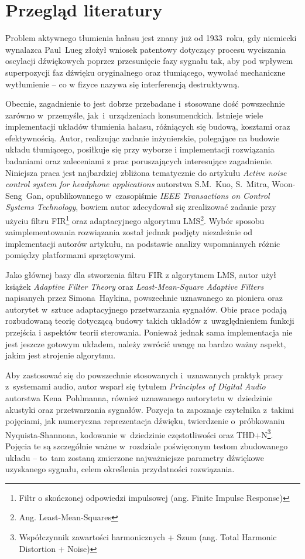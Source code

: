 \section{Przegląd literatury}
Problem aktywnego tłumienia hałasu jest znany już od 1933~roku, gdy niemiecki wynalazca Paul~Lueg złożył wniosek patentowy \cite{LuegPatent} dotyczący procesu wyciszania oscylacji dźwiękowych poprzez przesunięcie fazy sygnału tak, aby pod wpływem superpozycji faz dźwięku oryginalnego oraz tłumiącego, wywołać mechaniczne wytłumienie -- co w fizyce nazywa się interferencją destruktywną.

Obecnie, zagadnienie to jest dobrze przebadane i~stosowane dość powszechnie zarówno w~przemyśle, jak~i~urządzeniach konsumenckich. Istnieje wiele implementacji układów tłumienia hałasu, różniących się budową, kosztami oraz efektywnością. Autor, realizując zadanie inżynierskie, polegające na budowie układu tłumiącego, posiłkuje się przy wyborze i implementacji rozwiązania badaniami oraz zaleceniami z prac poruszających interesujące zagadnienie. Niniejsza praca jest najbardziej zbliżona tematycznie do artykułu \textit{Active noise control system for headphone applications} \cite{ANC4HP} autorstwa S.M.~Kuo, S.~Mitra, Woon-Seng~Gan, opublikowanego w~czasopiśmie \textit{IEEE Transactions on Control Systems Technology}, bowiem autor zdecydował się zrealizować zadanie przy użyciu filtru FIR\footnote{Filtr o skończonej odpowiedzi impulsowej (ang. Finite Impulse Response)} oraz  adaptacyjnego algorytmu LMS\footnote{Ang. Least-Mean-Squares}. Wybór sposobu zaimplementowania rozwiązania został jednak podjęty niezależnie od implementacji autorów artykułu, na podstawie analizy wspomnianych różnic pomiędzy platformami sprzętowymi.

Jako głównej bazy dla stworzenia filtru FIR z algorytmem LMS, autor użył książek \textit{Adaptive Filter Theory} \cite{HayAFT} oraz \textit{Least-Mean-Square Adaptive Filters} \cite{HayLMSAF} napisanych przez Simona~Haykina, powszechnie uznawanego za pioniera oraz autorytet w~sztuce adaptacyjnego przetwarzania sygnałów. Obie prace podają rozbudowaną teorię dotyczącą budowy takich układów z~uwzględnieniem funkcji przejścia i aspektów teorii sterowania. Ponieważ jednak sama implementacja nie jest jeszcze gotowym układem, należy zwrócić uwagę na bardzo ważny aspekt, jakim jest strojenie algorytmu.

Aby zastosować się do powszechnie stosowanych i~uznawanych praktyk pracy z~systemami audio, autor wsparł się tytułem \textit{Principles of Digital Audio} \cite{Pohlmann2010} autorstwa Kena~Pohlmanna, również uznawanego autorytetu w~dziedzinie akustyki oraz przetwarzania sygnałów. Pozycja ta zapoznaje czytelnika z~takimi pojęciami, jak numeryczna reprezentacja d\'zwięku, twierdzenie o~próbkowaniu Nyquista-Shannona, kodowanie w~dziedzinie częstotliwości oraz THD+N\footnote{Współczynnik zawartości harmonicznych + Szum	(ang. Total Harmonic Distortion + Noise)}. Pojęcia te są szczególnie ważne w~rozdziale poświęconym testom zbudowanego układu -- to~tam zostaną zmierzone najważniejsze parametry d\'zwiękowe uzyskanego sygnału, celem określenia przydatności rozwiązania.

